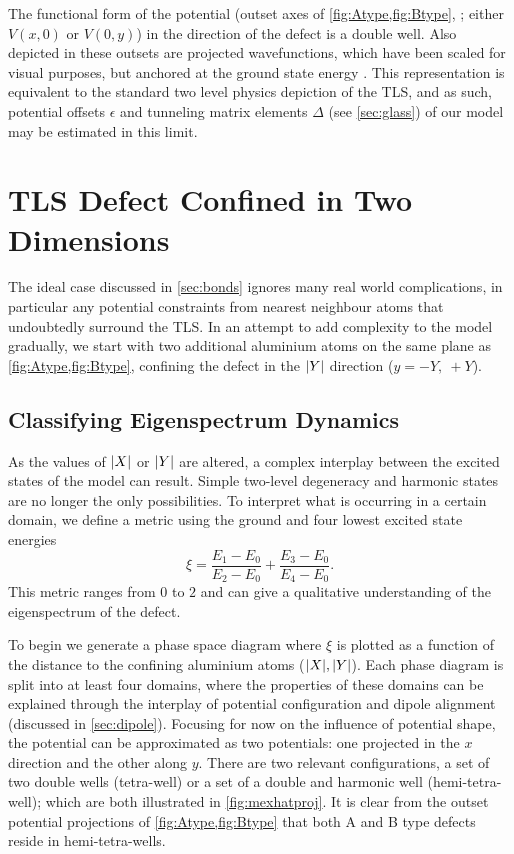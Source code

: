 The functional form of the  potential (outset axes of \cref{fig:Atype,fig:Btype}, ; either $V(x,0)$ or $V(0,y)$) in the direction of the defect is a double well.
Also depicted in these outsets are projected wavefunctions, which have been scaled for visual purposes, but anchored at the ground state energy .
This representation is equivalent to the standard two level physics depiction of the TLS, and as such, potential offsets $\epsilon$ and tunneling matrix elements $\Delta$ (see \cref{sec:glass}) of our model may be estimated in this limit.

\section{TLS Defect Confined in Two Dimensions}\label{sec:2d}

The ideal case discussed in \cref{sec:bonds} ignores many real world complications, in particular any potential constraints from nearest neighbour atoms that undoubtedly surround the TLS.
In an attempt to add complexity to the model gradually, we start with two additional aluminium atoms on the same plane as \cref{fig:Atype,fig:Btype}, confining the defect in the $\lvert Y\rvert$ direction (\ie $y = -Y, \: +Y$).

\subsection{Classifying Eigenspectrum Dynamics}

As the values of $\lvert X\rvert$ or $\lvert Y\rvert$ are altered, a complex interplay between the excited states of the model can result.
Simple two-level degeneracy and harmonic states are no longer the only possibilities. To interpret what is occurring in a certain domain, we define a metric using the ground and four lowest excited state energies
\begin{equation}
\xi=\frac{E_{1}-E_{0}}{E_{2}-E_{0}}+\frac{E_{3}-E_{0}}{E_{4}-E_{0}}.
\label{eq:ximetric}
\end{equation}
This metric ranges from $0$ to $2$ and can give a qualitative understanding of the eigenspectrum of the defect.

To begin we generate a phase space diagram where $\xi$ is plotted as a function of the distance to the confining aluminium atoms ($\lvert X\rvert,\lvert Y\rvert$).
Each phase diagram is split into at least four domains, where the properties of these domains can be explained through the interplay of potential configuration and dipole alignment (discussed in \cref{sec:dipole}).
Focusing for now on the influence of potential shape, the  potential can be approximated as two  potentials: one projected in the $x$ direction and the other along $y$.
There are two relevant configurations, a set of two double wells (tetra-well) or a set of a double and harmonic well (hemi-tetra-well); which are both illustrated in \cref{fig:mexhatproj}.
It is clear from the outset potential projections of \cref{fig:Atype,fig:Btype} that both A and B type defects reside in hemi-tetra-wells.

